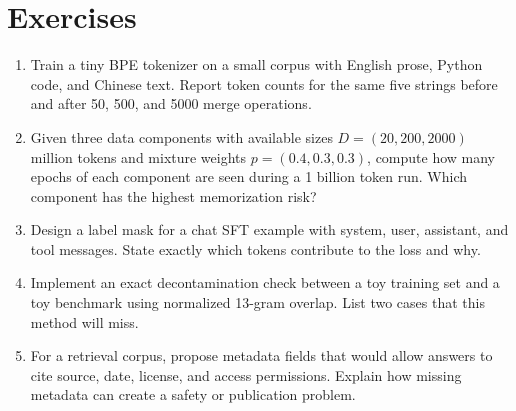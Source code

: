 \section{Exercises}
\label{sec:chapter-two-exercises}

\begin{enumerate}
\item Train a tiny BPE tokenizer on a small corpus with English prose, Python code, and Chinese text. Report token counts for the same five strings before and after 50, 500, and 5000 merge operations.
\item Given three data components with available sizes $D=(20,200,2000)$ million tokens and mixture weights $p=(0.4,0.3,0.3)$, compute how many epochs of each component are seen during a 1 billion token run. Which component has the highest memorization risk?
\item Design a label mask for a chat SFT example with system, user, assistant, and tool messages. State exactly which tokens contribute to the loss and why.
\item Implement an exact decontamination check between a toy training set and a toy benchmark using normalized 13-gram overlap. List two cases that this method will miss.
\item For a retrieval corpus, propose metadata fields that would allow answers to cite source, date, license, and access permissions. Explain how missing metadata can create a safety or publication problem.
\end{enumerate}
